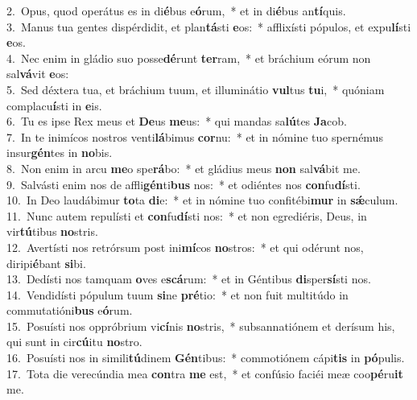 {2.~}Opus, quod operátus es in di\textbf{é}bus e\textbf{ó}rum,~* et in di\textbf{é}bus an\textbf{tí}quis.\\
{3.~}Manus tua gentes dispérdidit, et plan\textbf{tá}sti \textbf{e}os:~* afflixísti pópulos, et expu\textbf{lí}sti \textbf{e}os.\\
{4.~}Nec enim in gládio suo posse\textbf{dé}runt \textbf{ter}ram,~* et bráchium eórum non sal\textbf{vá}vit \textbf{e}os:\\
{5.~}Sed déxtera tua, et bráchium tuum, et illuminátio \textbf{vul}tus \textbf{tu}i,~* quóniam complacu\textbf{í}sti in \textbf{e}is.\\
{6.~}Tu es ipse Rex meus et \textbf{De}us \textbf{me}us:~* qui mandas sa\textbf{lú}tes \textbf{Ja}cob.\\
{7.~}In te inimícos nostros venti\textbf{lá}bimus \textbf{cor}nu:~* et in nómine tuo spernémus insur\textbf{gén}tes in \textbf{no}bis.\\
{8.~}Non enim in arcu \textbf{me}o spe\textbf{rá}bo:~* et gládius meus \textbf{non} sal\textbf{vá}bit me.\\
{9.~}Salvásti enim nos de affli\textbf{gén}ti\textbf{bus} nos:~* et odiéntes nos \textbf{con}fu\textbf{dí}sti.\\
{10.~}In Deo laudábimur \textbf{to}ta \textbf{di}e:~* et in nómine tuo confitébi\textbf{mur} in \textbf{sǽ}culum.\\
{11.~}Nunc autem repulísti et \textbf{con}fu\textbf{dí}sti nos:~* et non egrediéris, Deus, in vir\textbf{tú}tibus \textbf{no}stris.\\
{12.~}Avertísti nos retrórsum post ini\textbf{mí}cos \textbf{no}stros:~* et qui odérunt nos, diripi\textbf{é}bant \textbf{si}bi.\\
{13.~}Dedísti nos tamquam \textbf{o}ves e\textbf{scá}rum:~* et in Géntibus \textbf{di}sper\textbf{sí}sti nos.\\
{14.~}Vendidísti pópulum tuum \textbf{si}ne \textbf{pré}tio:~* et non fuit multitúdo in commutatióni\textbf{bus} e\textbf{ó}rum.\\
{15.~}Posuísti nos oppróbrium vi\textbf{cí}nis \textbf{no}stris,~* subsannatiónem et derísum his, qui sunt in cir\textbf{cú}itu \textbf{no}stro.\\
{16.~}Posuísti nos in simili\textbf{tú}dinem \textbf{Gén}tibus:~* commotiónem cápi\textbf{tis} in \textbf{pó}pulis.\\
{17.~}Tota die verecúndia mea \textbf{con}tra \textbf{me} est,~* et confúsio faciéi meæ coo\textbf{pé}ru\textbf{it} me.\\
